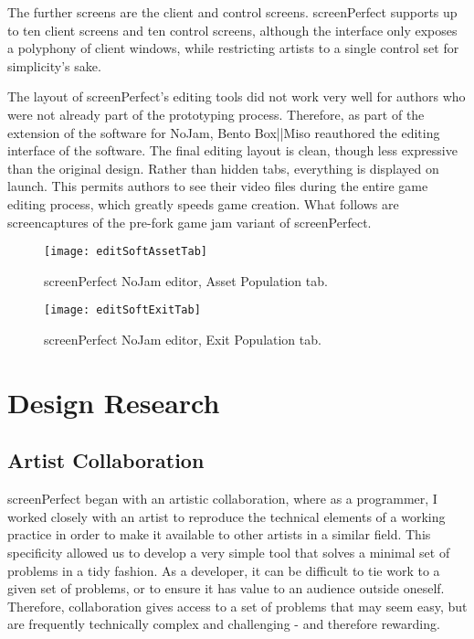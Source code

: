 The further screens are the client and control screens. screenPerfect supports up to ten client screens and ten control screens, although the interface only exposes a polyphony of client windows, while restricting artists to a single control set for simplicity's sake.

The layout of screenPerfect's editing tools did not work very well for authors who were not already part of the prototyping process. Therefore, as part of the extension of the software for NoJam, Bento Box||Miso reauthored the editing interface of the software. 
The final editing layout is clean, though less expressive than the original design. Rather than hidden tabs, everything is displayed on launch. This permits authors to see their video files during the entire game editing process, which greatly speeds game creation. 
What follows are screencaptures of the pre-fork game jam variant of screenPerfect.

\newpage
\begin{figure}[h]
 \caption{screenPerfect NoJam editor, Asset Population tab.}
 \centering
 \texttt{[image: editSoftAssetTab]}
\end{figure}

\begin{figure}[h]
 \caption{screenPerfect NoJam editor, Exit Population tab.}
 \centering
 \texttt{[image: editSoftExitTab]}
\end{figure}

\newpage
\section{Design Research}
\subsection{Artist Collaboration}
screenPerfect began with an artistic collaboration, where as a programmer, I worked closely with an artist to reproduce the technical elements of a working practice in order to make it available to other artists in a similar field. This specificity allowed us to develop a very simple tool that solves a minimal set of problems in a tidy fashion. As a developer, it can be difficult to tie work to a given set of problems, or to ensure it has value to an audience outside oneself. Therefore, collaboration gives access to a set of problems that may seem easy, but are frequently technically complex and challenging - and therefore rewarding. 

